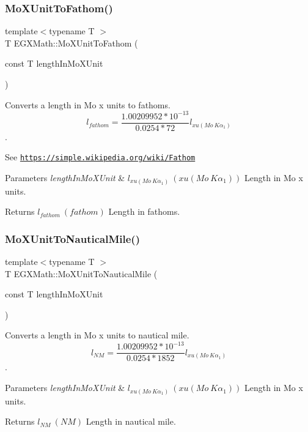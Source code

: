 \subsubsection{\texorpdfstring{Mo\+X\+Unit\+To\+Fathom()}{MoXUnitToFathom()}}
{\footnotesize\ttfamily template$<$typename T $>$ \\
T E\+G\+X\+Math\+::\+Mo\+X\+Unit\+To\+Fathom (\begin{DoxyParamCaption}\item[{const T}]{length\+In\+Mo\+X\+Unit }\end{DoxyParamCaption})}



Converts a length in Mo x units to fathoms. \[ l_{fathom}= \frac{1.00209952*10^{-13}}{0.0254 * 72} l_{xu(Mo\ K\alpha_1)} \]. 

See \href{https://simple.wikipedia.org/wiki/Fathom}{\tt https\+://simple.\+wikipedia.\+org/wiki/\+Fathom} 
\begin{DoxyParams}{Parameters}
{\em length\+In\+Mo\+X\+Unit} & $ l_{xu(Mo\ K\alpha_1)}\ (xu(Mo\ K\alpha_1))$ Length in Mo x units. \\
\hline
\end{DoxyParams}
\begin{DoxyReturn}{Returns}
$ l_{fathom}\ (fathom)$ Length in fathoms. 
\end{DoxyReturn}
\mbox{\label{group___e_g_x_math-_conversions-_length_conversions-_non-_s_i-_mo_x_unit-_nautical_ga034fe0d8e6dbb0b0a588099a5b9d2c51}} 
\subsubsection{\texorpdfstring{Mo\+X\+Unit\+To\+Nautical\+Mile()}{MoXUnitToNauticalMile()}}
{\footnotesize\ttfamily template$<$typename T $>$ \\
T E\+G\+X\+Math\+::\+Mo\+X\+Unit\+To\+Nautical\+Mile (\begin{DoxyParamCaption}\item[{const T}]{length\+In\+Mo\+X\+Unit }\end{DoxyParamCaption})}



Converts a length in Mo x units to nautical mile. \[ l_{NM}= \frac{1.00209952*10^{-13}}{0.0254 * 1852} l_{xu(Mo\ K\alpha_1)} \]. 


\begin{DoxyParams}{Parameters}
{\em length\+In\+Mo\+X\+Unit} & $ l_{xu(Mo\ K\alpha_1)}\ (xu(Mo\ K\alpha_1))$ Length in Mo x units. \\
\hline
\end{DoxyParams}
\begin{DoxyReturn}{Returns}
$ l_{NM}\ (NM)$ Length in nautical mile. 
\end{DoxyReturn}
